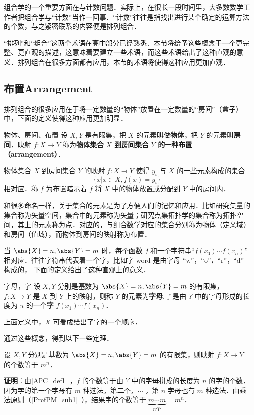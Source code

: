 
组合学的一个重要方面在与计数问题．实际上，在很长一段时间里，大多数数学工作者把组合学与“计数”当作一回事．“计数”往往是指找出进行某个确定的运算方法的个数，与之紧密联系的内容便是排列组合．

“排列”和“组合”这两个术语在高中部分已经熟悉．本节将给予这些概念于一个更完整、更直观的描述，这意味着要建立一些术语，而这些术语给出了这种直观的意义．排列组合在很多方面都有应用，本节的术语将使得这种应用更加直观．
\subsection{布置Arrangement}
排列组合的很多应用在于将一定数量的“物体”放置在一定数量的“房间”（盒子）中，下面的定义使得这种应用更加明显．
\begin{definition}{物体、房间、布置}\label{APC_def2}
设 $X,Y$ 是有限集，把 $X$ 的元素叫做\textbf{物体}，把 $Y$ 的元素叫\textbf{房间}．映射 $f:X\rightarrow Y$ 称为\textbf{物体集合 $X$ 到房间集合 $Y$ 的一种\textbf{布置}（arrangement）}．
\end{definition}
物体集合 $X$ 到房间集合 $Y$ 的映射 $f:X\rightarrow Y$ 使得 $y_i$ 与 $X$ 的一些元素构成的集合
\begin{equation}
\{x|x\in X,f(x)=y_i\}
\end{equation}
相对应．称 $f$ 为布置暗示着 $f$ 将 $X$ 中的物体放置或分配到 $Y$ 中的房间内．

和很多命名一样，关于集合的元素是为了方便人们的记忆和应用．比如研究矢量的集合称为矢量空间，集合中的元素称为矢量；研究点集拓扑学的集合称为拓扑空间，其上的元素称为点．对应的，与组合数学对应的集合分别称为物体（定义域）和房间（值域），而物体到房间的映射称为布置．

当 $\abs{X}=n,\abs{Y}=m$ 时，每个函数 $f$ 和一个字符串“$f(x_1)\cdots f(x_n)$” 相对应．往往字符串代表着一个字，比如字 word 是由字母 “w”，“o”，“r”，“d” 构成的， 下面的定义给出了这种直观上的意义．
\begin{definition}{字母，字}\label{APC_def1}
设 $X,Y$ 分别是基数为 $\abs{X}=n,\abs{Y}=m$ 的有限集， $f:X\rightarrow Y$ 是 $X$ 到 $Y$ 上的映射，则称 $Y$ 的元素为\textbf{字母}, $f$ 是由 $Y$ 中的字母形成的长度为 $n$ 的一个\textbf{字} $f(x_1)\cdots f(x_n)$．
\end{definition}
上面定义中，$X$ 可看成给出了字的一个顺序．

通过这些概念，得到以下一些定理．

\begin{theorem}{}\label{APC_the1}
设 $X,Y$ 分别是基数为 $\abs{X}=n,\abs{Y}=m$ 的有限集，则映射 $f:X\rightarrow Y$ 的个数等于 $m^n$．
\end{theorem}
\textbf{证明：}由\autoref{APC_def1} ，$f$ 的个数等于由 $Y$ 中的字母拼成的长度为 $n$ 的字的个数．因为字的第一个字母有 $m$ 种选法，第二个，$\cdots$ ，第 $n$ 字母也有 $m$ 种选法．由乘法原则（\autoref{ProfPM_sub1}~），结果字的个数等于 $\underbrace{m\cdots m}_{n\text{个}}=m^n$．

